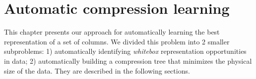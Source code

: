 
\chapter{Automatic compression learning} %





% 

This chapter presents our approach for automatically learning the best representation of a set of columns. We divided this problem into 2 smaller subproblems: 1) automatically identifying \textit{whitebox} representation opportunities in data; 2) automatically building a compression tree that minimizes the physical size of the data. They are described in the following sections.







